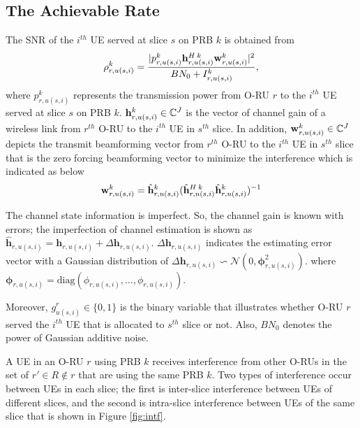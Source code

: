 \documentclass[lettersize,journal]{IEEEtran}
\begin{document}
\subsection{The Achievable Rate}
The SNR of the $i^{th}$ UE served at slice $s$ on PRB $k$ is obtained from
\begin{equation}\label{eq1}
\rho_{r,u(s,i)}^{k} =  \frac{|p_{r,u(s,i)}^{k}{\bold{h}_{r,u(s,i)}^{H \: k}} \bold{w}_{r,u(s,i)}^{k}|^2}{BN_0 + I_{r,u(s,i)}^{k}},
\end{equation}
where $p_{r,u(s,i)}^{k}$ represents the transmission power from O-RU $r$ to the $i^{th}$ UE served at slice $s$ on PRB $k$.
${\bold{h}_{r,u(s,i)}^{k}} \in \mathbb{C}^{J}$ is the vector of channel gain of a wireless link from
$r^{th}$ O-RU to the $i^{th}$ UE in $s^{th}$ slice. In addition, $\bold{w}_{r,u(s,i)}^{k} \in \mathbb{C}^{J}$ depicts the  transmit beamforming vector from $r^{th}$ O-RU to the $i^{th}$ UE in $s^{th}$ slice that is the zero forcing beamforming vector to minimize the interference which is indicated as below
\begin{equation}
\bold{w}_{r,u(s,i)}^{k} = \hat{\bold{h}}_{r,u(s,i)}^{k}(\hat{\bold{h}}_{r,u(s,i)}^{H \: k} \hat{\bold{h}}_{r,u(s,i)}^{k})^{-1}
\end{equation}

The channel state information is imperfect. So, the channel gain is known with errors; the imperfection of channel estimation is shown as
$\hat{\boldsymbol{h}}_{r,u(s,i)} = \boldsymbol{h}_{r,u(s,i)} + \Delta \boldsymbol{h}_{r,u(s,i)}$.
$\Delta \boldsymbol{h}_{r,u(s,i)}$ indicates the estimating error vector with a Gaussian distribution of
$\Delta \boldsymbol{h}_{r,u(s,i)}\backsim \mathcal{N}(0,\boldsymbol{\phi}_{r,u(s,i)}^2)$.
where $\boldsymbol{\phi}_{r,u(s,i)} = \text{diag}(\phi_{r,u(s,i)},\ldots,\phi_{r,u(s,i)}).$

Moreover, $g_{u(s,i)}^r \in \{0,1\}$ is the binary variable that illustrates whether O-RU $r$ served the $i^{th}$ UE that is allocated to $s^{th}$ slice or not.
Also, $BN_0$ denotes the power of Gaussian additive noise.

A UE in an O-RU $r$ using PRB $k$ receives interference from other O-RUs in the set of $r' \in R \not\in r$ that are using the same PRB $k$. Two types of interference occur between UEs in each slice; the first is inter-slice interference between UEs of different slices, and the second is intra-slice interference between UEs of the same slice that is shown in Figure \ref{fig:intf}.
 
\end{document}
